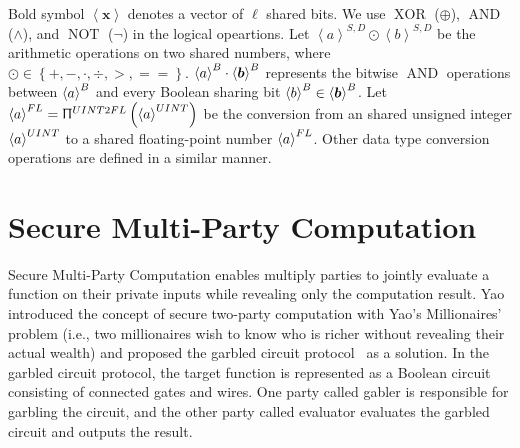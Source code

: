 Bold symbol $\left\langle \boldsymbol{x}\right\rangle $ denotes a vector of $\ell$ shared bits.
We use $\operatorname{XOR}$ ($\oplus $), $\operatorname{AND}$ ($\land $), and $\operatorname{NOT}$ ($\neg$) in the logical opeartions.
Let $\left\langle {a}\right\rangle^{S,D} \odot \left\langle {b}\right\rangle^{S,D}$ be the arithmetic operations on two shared numbers, where $\odot\in\left\{+, -, \cdot, \div, >, ==\right\} $. $\left\langle a\right\rangle ^{B} \cdot \left\langle \boldsymbol{b}\right\rangle ^{B}$ represents the bitwise $\operatorname{AND}$ operations between $\left\langle a\right\rangle ^{B}$ and every Boolean sharing bit $\left\langle b\right\rangle^{B} \in\left\langle \boldsymbol{b}\right\rangle ^{B}$.
Let $\left\langle {a}\right\rangle ^{FL}=\Uppi^{UINT2FL}\left(\left\langle {a}\right\rangle ^{UINT}\right) $ be the conversion from an shared unsigned integer $\left\langle {a}\right\rangle ^{UINT}$ to a shared floating-point number $\left\langle {a}\right\rangle ^{FL}$. Other data type conversion operations are defined in a similar manner.


\section{Secure Multi-Party Computation}
\label{sec:secureMultipartyComputation}
Secure Multi-Party Computation enables multiply parties to jointly evaluate a function on their private inputs while revealing only the computation result. Yao~\cite{yao1982protocols} introduced the concept of secure two-party computation with Yao's Millionaires' problem (i.e., two millionaires wish to know who is richer without revealing their actual wealth) and proposed the garbled circuit protocol~\cite{yao1986generate} as a solution.
In the garbled circuit protocol, the target function is represented as a Boolean circuit consisting of connected gates and wires. One party called gabler is responsible for garbling the circuit, and the other party called evaluator evaluates the garbled circuit and outputs the result.

